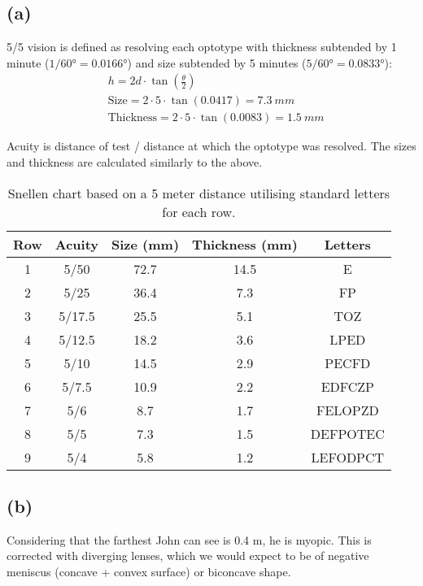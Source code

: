 \subsection*{(a)}
5/5 vision is defined as resolving each optotype with thickness subtended by 1 minute ($ 1/\ang{60} = \ang{0.0166}$) and size subtended by 5 minutes ($ 5/\ang{60} = \ang{0.0833}$):
\begin{equation}
    \begin{split}
        &h = 2d \cdot \tan \left(\frac{\theta}{2}\right) \\
        &\text{Size} = 2 \cdot 5 \cdot \tan(0.0417) = \SI{7.3}{mm} \\
        &\text{Thickness}  = 2 \cdot 5 \cdot \tan(0.0083) = \SI{1.5}{mm}
    \end{split}
\end{equation}

Acuity is distance of test / distance at which the optotype was resolved. The sizes and thickness are calculated similarly to the above.

\begin{table}[h] \centering
    \begin{tabular}{ccccc}
        \toprule
        Row & Acuity & Size (mm) & Thickness (mm) & Letters\\
        \midrule
        1 & 5/50 &72.7 & 14.5 & E \\
        2 & 5/25& 36.4 & 7.3 & FP \\
        3 & 5/17.5&25.5 & 5.1 & TOZ \\
        4 & 5/12.5&18.2 & 3.6 & LPED \\
        5 & 5/10& 14.5 & 2.9 & PECFD \\
        6 & 5/7.5& 10.9 & 2.2 & EDFCZP \\
        7 & 5/6 &8.7 & 1.7 & FELOPZD \\
        8 & 5/5& 7.3 & 1.5 & DEFPOTEC \\
        9 & 5/4& 5.8 & 1.2 & LEFODPCT \\
        \bottomrule
    \end{tabular}
    \caption{Snellen chart based on a 5 meter distance utilising standard letters for each row.}
\end{table}

\subsection*{(b)}
Considering that the farthest John can see is 0.4 m, he is myopic. This is corrected with diverging lenses, which we would expect to be of negative meniscus (concave + convex surface) or biconcave shape. 

